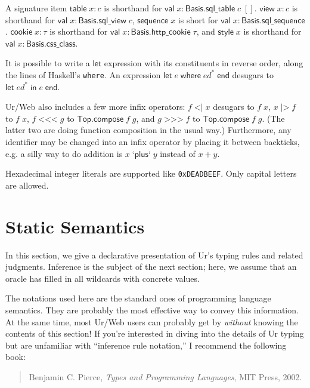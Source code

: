 \documentclass{article}
\newcommand{\cd}[1]{\texttt{#1}}
\newcommand{\mt}[1]{\mathsf{#1}}
\begin{document}
A signature item $\mt{table} \; x : c$ is shorthand for $\mt{val} \; x : \mt{Basis}.\mt{sql\_table} \; c \; []$.  $\mt{view} \; x : c$ is shorthand for $\mt{val} \; x : \mt{Basis}.\mt{sql\_view} \; c$, $\mt{sequence} \; x$ is short for $\mt{val} \; x : \mt{Basis}.\mt{sql\_sequence}$.  $\mt{cookie} \; x : \tau$ is shorthand for $\mt{val} \; x : \mt{Basis}.\mt{http\_cookie} \; \tau$, and $\mt{style} \; x$ is shorthand for $\mt{val} \; x : \mt{Basis}.\mt{css\_class}$.

It is possible to write a $\mt{let}$ expression with its constituents in reverse order, along the lines of Haskell's \cd{where}.  An expression $\mt{let} \; e \; \mt{where} \; ed^* \; \mt{end}$ desugars to $\mt{let} \; ed^* \; \mt{in} \; e \; \mt{end}$.

Ur/Web also includes a few more infix operators: $f \; \texttt{<|} \; x$ desugars to $f \; x$, $x \; \texttt{|>} \; f$ to $f \; x$, $f \; \texttt{<{}<{}<} \; g$ to $\mt{Top}.\mt{compose} \; f \; g$, and $g \; \texttt{>{}>{}>} \; f$ to $\mt{Top}.\mt{compose} \; f \; g$.  (The latter two are doing function composition in the usual way.)  Furthermore, any identifier may be changed into an infix operator by placing it between backticks, e.g. a silly way to do addition is $x \; \texttt{`}\mt{plus}\texttt{`} \; y$ instead of $x + y$.

Hexadecimal integer literals are supported like \texttt{0xDEADBEEF}.  Only capital letters are allowed.


\section{Static Semantics}

In this section, we give a declarative presentation of Ur's typing rules and related judgments.  Inference is the subject of the next section; here, we assume that an oracle has filled in all wildcards with concrete values.

The notations used here are the standard ones of programming language semantics.  They are probably the most effective way to convey this information.  At the same time, most Ur/Web users can probably get by \emph{without} knowing the contents of this section!  If you're interested in diving into the details of Ur typing but are unfamiliar with ``inference rule notation,'' I recommend the following book:
\begin{quote}
  Benjamin C. Pierce, \emph{Types and Programming Languages}, MIT Press, 2002.
\end{quote}
\end{document}
